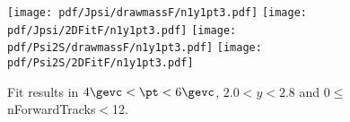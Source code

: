 \begin{figure}[H]
\begin{center}
\texttt{[image: pdf/Jpsi/drawmassF/n1y1pt3.pdf]}
\texttt{[image: pdf/Jpsi/2DFitF/n1y1pt3.pdf]}
\vspace*{-0.5cm}
\texttt{[image: pdf/Psi2S/drawmassF/n1y1pt3.pdf]}
\texttt{[image: pdf/Psi2S/2DFitF/n1y1pt3.pdf]}
\vspace*{-0.5cm}
\end{center}
\caption{Fit results in $4\gevc<\pt<6\gevc$, $2.0<y<2.8$ and 0$\leq$nForwardTracks$<$12.}
\label{Fitn1y1pt3}
\end{figure}
